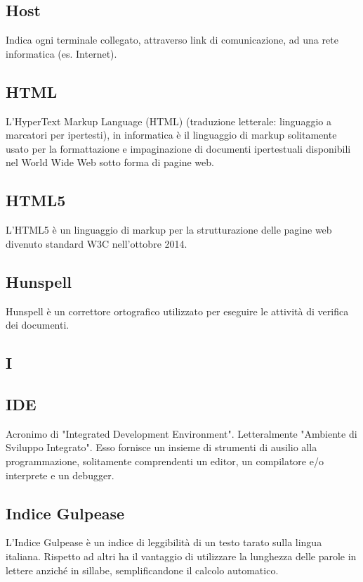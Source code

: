 \subsection*{Host}
Indica ogni terminale collegato, attraverso link di comunicazione, ad una rete informatica (es. Internet).

\subsection*{HTML}
L'HyperText Markup Language (HTML) (traduzione letterale: linguaggio a marcatori per ipertesti), in informatica è il linguaggio di markup solitamente usato per la formattazione e impaginazione di documenti ipertestuali disponibili nel World Wide Web sotto forma di pagine web.

\subsection*{HTML5}
L’HTML5 è un linguaggio di markup per la strutturazione delle pagine web divenuto
standard W3C nell’ottobre 2014.

\subsection*{Hunspell}
Hunspell è un correttore ortografico utilizzato per eseguire le attività di verifica dei documenti.

\newpage

\begin{center}
\Huge\section*{\uppercase{I}}
\end{center}

\subsection*{IDE}
Acronimo di "Integrated Development Environment". Letteralmente "Ambiente
di Sviluppo Integrato". Esso fornisce un insieme di strumenti di ausilio
alla programmazione, solitamente comprendenti un editor, un compilatore e/o
interprete e un debugger.

\subsection*{Indice Gulpease}
L'Indice Gulpease è un indice di leggibilità di un testo tarato sulla lingua
italiana. Rispetto ad altri ha il vantaggio di utilizzare la lunghezza delle parole in lettere
anziché in sillabe, semplificandone il calcolo automatico.

